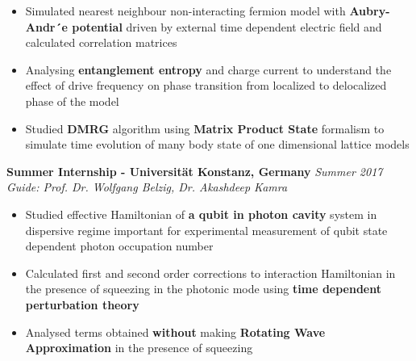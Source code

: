 \documentclass[10pt]{article}%
\begin{document}
{\begin{itemize}
    \setlength\itemsep{0.01em}
    \item Simulated nearest neighbour non-interacting fermion model with \textbf{Aubry-Andr´e potential} driven by external time dependent electric field and calculated correlation matrices
    \item Analysing \textbf{entanglement entropy} and charge current to understand the effect of drive frequency on phase transition from localized to delocalized phase of the model
    \item Studied \textbf{DMRG} algorithm using \textbf{Matrix Product State} formalism to simulate time evolution of many body state of one dimensional lattice models
\end{itemize}

{\flushleft \bf \large{Summer Internship - Universit\"{a}t Konstanz, Germany}}  \hfill \textit{Summer 2017} \\
{\em Guide: Prof. Dr. Wolfgang Belzig, Dr. Akashdeep Kamra }\\
\vspace{-5mm}
\begin{itemize}
    \setlength\itemsep{0.01em}
    \item Studied effective Hamiltonian of \textbf{a qubit in photon cavity} system in dispersive regime important for experimental measurement of qubit state dependent photon occupation number
    \item Calculated first and second order corrections to interaction Hamiltonian in the presence of squeezing in the photonic mode using \textbf{time dependent perturbation theory}
    \item Analysed terms obtained \textbf{without} making \textbf{Rotating Wave Approximation} in the presence of squeezing
\end{itemize}



}
\end{document}
